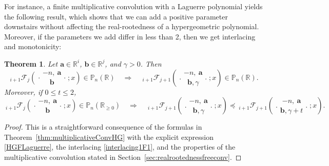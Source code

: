 \documentclass[reqno,11pt]{amsart}
\newtheorem{theorem}{Theorem}[section]
\theoremstyle{remark}
\renewcommand{\P}{\mathbb{P}}
\newcommand{\R}{\mathbb{R}}
\newcommand*\pFq[5]{%
 {\ }_{#1}{\mathcal F}_{#2}{\left(\genfrac..{0pt}{}{#3}{#4};#5\right)}%
}
\begin{document}
For instance, a finite multiplicative convolution with a Laguerre polynomial yields the following result, which shows that we can add a positive parameter downstairs without affecting the real-rootedness of a hypergeometric polynomial. Moreover, if the parameters we add differ in less than 2, then we get interlacing and monotonicity:
\begin{theorem}
    \label{prop:addingbelow}
Let $\bm a\in \R^i$, $\bm b \in \R^j$, and $\gamma >0$.  Then
    \begin{equation}
        \label{addingBelow}
        \pFq{i+1}{j}{-n,\ \bm a}{ \bm b}{x} \in \P_n(\R)
     \quad \Longrightarrow \quad 
    \pFq{i+1}{j+1}{-n,\ \bm a}{ \bm b, \gamma}{x} \in \P_n(\R).
    \end{equation}
    Moreover, if  $0\leq t\leq 2$,  
    $$
    \pFq{i+1}{j}{-n,\ \bm a}{ \bm b}{x} \in \P_n(\R_{\geq0}) \quad \Longrightarrow \quad \pFq{i+1}{j+1}{-n,\ \bm a}{ \bm b, \gamma}{x}\preccurlyeq\pFq{i+1}{j+1}{-n,\ \bm a}{ \bm b, \gamma+t}{x}.
    $$
\end{theorem}
\begin{proof}
    This is a straightforward consequence of the formulas in Theorem~\ref{thm:multiplicativeConvHG} with the explicit expression \eqref{HGFLaguerre}, the interlacing \eqref{interlacing1F1}, and the properties of the multiplicative convolution stated in Section~\ref{sec:realrootednessfreeconv}.
\end{proof}
\end{document}
